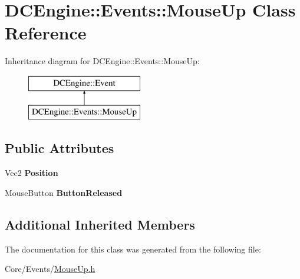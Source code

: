 \hypertarget{classDCEngine_1_1Events_1_1MouseUp}{\section{D\-C\-Engine\-:\-:Events\-:\-:Mouse\-Up Class Reference}
\label{classDCEngine_1_1Events_1_1MouseUp}
}
Inheritance diagram for D\-C\-Engine\-:\-:Events\-:\-:Mouse\-Up\-:\begin{figure}[H]
\begin{center}
\leavevmode
\includegraphics[height=2.000000cm]{classDCEngine_1_1Events_1_1MouseUp}
\end{center}
\end{figure}
\subsection*{Public Attributes}
\begin{DoxyCompactItemize}
\item 
\hypertarget{classDCEngine_1_1Events_1_1MouseUp_a5746825900ba5474f5c3e08dc629cbef}{Vec2 {\bfseries Position}}\label{classDCEngine_1_1Events_1_1MouseUp_a5746825900ba5474f5c3e08dc629cbef}

\item 
\hypertarget{classDCEngine_1_1Events_1_1MouseUp_a361ae87a3e3d9024c2984e0817f4afe0}{Mouse\-Button {\bfseries Button\-Released}}\label{classDCEngine_1_1Events_1_1MouseUp_a361ae87a3e3d9024c2984e0817f4afe0}

\end{DoxyCompactItemize}
\subsection*{Additional Inherited Members}


The documentation for this class was generated from the following file\-:\begin{DoxyCompactItemize}
\item 
Core/\-Events/\hyperlink{MouseUp_8h}{Mouse\-Up.\-h}\end{DoxyCompactItemize}
